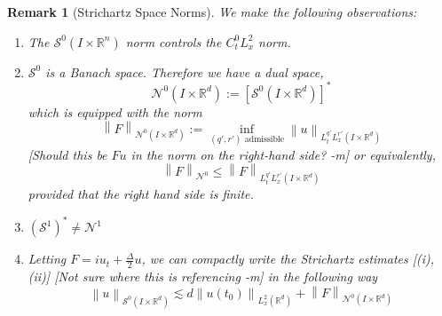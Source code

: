 \documentclass{article}
\def\purple{\color{Purple}}
\newcommand{\pnote}[1]{{\purple [#1]}} %
\newtheorem{remark}{Remark}
\def\R{\mathbb{R}} %
\newcommand\norm[1]{\left\lVert#1\right\rVert}
\begin{document}
\begin{remark}[Strichartz Space Norms]
  \label{rmk:strichartz-space-norms}
  We make the following observations:
  \begin{enumerate}
    \item The $\mathcal{S}^{0}(I\times \R^n)$ norm controls the
    $C_{t}^{0}L_{x}^{2}$ norm.
    \item $\mathcal{S}^{0}$ is a Banach space. Therefore we have a dual space,
    \begin{equation}\label{eq:13}
      \mathcal{N}^{0}(I\times \R^d):=[\mathcal{S}^{0}(I\times \R^d)]^{*}
    \end{equation}
    which is equipped with the norm
    \begin{equation*}
      \norm{F}_{\mathcal{N}^{0}(I\times \R^d)} 
      := \inf_{(q',r') \text{ admissible}} \norm{u}_{L_{t}^{q'}L^{r'}_{x}(I\times \R^d)}
    \end{equation*}
    \pnote{Should this be $Fu$ in the norm on the right-hand side?  -m}
    or equivalently,
    \begin{equation*}
      \norm{F}_{\mathcal{N}^{0}} \leq \norm{F}_{L_{t}^{q'}L_{x}^{r'}(I\times \R^d)}
    \end{equation*}
    provided that the right hand side is finite.
    \item $(\mathcal{S}^{1})^{*}\neq \mathcal{N}^{1}$
    \item Letting $F=i u_{t}+\frac{\Delta}{2}u$, we can compactly write the
    Strichartz estimates [(i),(ii)] \pnote{Not sure where this is referencing
      -m} in the following way
    \begin{equation}\label{eq:compactly-written-strichartz}
      \norm{u}_{\mathcal{S}^{0}(I\times \R^d)} 
      \lesssim d \norm{u(t_{0})}_{L_{x}^{2}(\R^d)}+\norm{F}_{\mathcal{N}^{0}(I\times \R^d)}
    \end{equation}
  \end{enumerate}
\end{remark}
\end{document}
